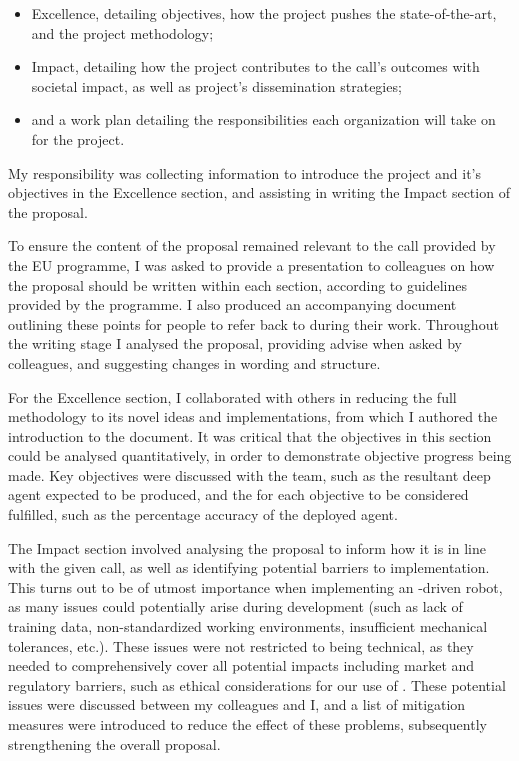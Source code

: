 \begin{itemize}
    \item Excellence, detailing objectives, how the project pushes the state-of-the-art, and the
          project methodology;
    \item Impact, detailing how the project contributes to the call's outcomes with societal
          impact, as well as project's dissemination strategies;
    \item and a work plan detailing the responsibilities each organization will take on for the
          project.
\end{itemize}

My responsibility was collecting information to introduce the project and it's objectives in the
Excellence section, and assisting in writing the Impact section of the proposal.

To ensure the content of the proposal remained relevant to the call provided by the EU programme, I
was asked to provide a presentation to colleagues on how the proposal should be written within each
section, according to guidelines provided by the programme. I also produced an accompanying document
outlining these points for people to refer back to during their work. Throughout the writing stage I
analysed the proposal, providing advise when asked by colleagues, and suggesting changes in wording
and structure.

For the Excellence section, I collaborated with others in reducing the full methodology to its novel
ideas and implementations, from which I authored the introduction to the document. It was critical
that the objectives in this section could be analysed quantitatively, in order to demonstrate
objective progress being made. Key objectives were discussed with the team, such as the resultant
deep  agent expected to be produced, and the  for each objective to be
considered fulfilled, such as the percentage accuracy of the deployed  agent.

The Impact section involved analysing the proposal to inform how it is in line with the given call,
as well as identifying potential barriers to implementation. This turns out to be of utmost
importance when implementing an -driven robot, as many issues could potentially arise
during development (such as lack of training data, non-standardized working environments,
insufficient mechanical tolerances, etc.). These issues were not restricted to being technical, as
they needed to comprehensively cover all potential impacts including market and regulatory barriers,
such as ethical considerations for our use of \@. These potential issues were discussed
between my colleagues and I, and a list of mitigation measures were introduced to reduce the effect
of these problems, subsequently strengthening the overall proposal.

